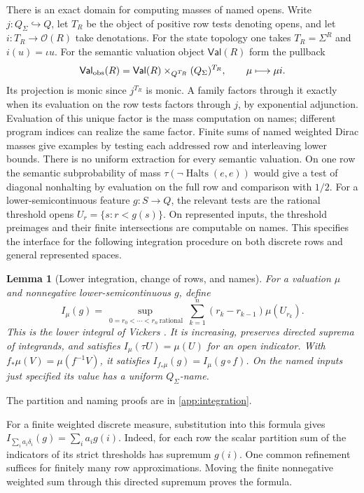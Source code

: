 \documentclass[11pt,a4paper]{article}
\newtheorem{lemma}[lemma]{Lemma}
\theoremstyle{definition}
\theoremstyle{remark}\newaliascnt{remark}{theorem}
\numberwithin{equation}{section}
\begin{document}
There is an exact domain for computing masses of named opens. Write $j:Q_\Sigma\hookrightarrow Q$, let $T_R$ be the object of positive row tests denoting opens, and let $i:T_R\to\mathcal O(R)$ take denotations. For the state topology one takes $T_R=\Sigma^R$ and $i(u)=\iota u$. For the semantic valuation object $\mathsf{Val}(R)$ form the pullback
\[
 \mathsf{Val}_{\rm obs}(R)
 =\mathsf{Val}(R)\times_{Q^{T_R}}(Q_\Sigma)^{T_R},
 \qquad \mu\longmapsto\mu i .
\]
Its projection is monic since $j^{T_R}$ is monic. A family factors through it exactly when its evaluation on the row tests factors through $j$, by exponential adjunction. Evaluation of this unique factor is the mass computation on names; different program indices can realize the same factor. Finite sums of named weighted Dirac masses give examples by testing each addressed row and interleaving lower bounds. There is no uniform extraction for every semantic valuation. On one row the semantic subprobability of mass $\tau(\neg\operatorname{Halts}(e,e))$ would give a test of diagonal nonhalting by evaluation on the full row and comparison with $1/2$. For a lower-semicontinuous feature $g:S\to Q$, the relevant tests are the rational threshold opens $U_r=\{s:r<g(s)\}$. On represented inputs, the threshold preimages and their finite intersections are computable on names. This specifies the interface for the following integration procedure on both discrete rows and general represented spaces.

\begin{lemma}[Lower integration, change of rows, and names]\label{lem:eff-integral}
For a valuation \(\mu\) and nonnegative lower-semicontinuous \(g\), define
\[
 I_\mu(g)=\sup_{\ 0=r_0<\cdots<r_n\ \mathrm{rational}}
              \ \sum_{k=1}^n(r_k-r_{k-1})\mu(U_{r_k}).
\]
This is the lower integral of Vickers \cite[Definition 9]{vickers}. It is increasing, preserves directed suprema of integrands, and satisfies \(I_\mu(\tau U)=\mu(U)\) for an open indicator. With \(f_*\mu(V)=\mu(f^{-1}V)\), it satisfies \(I_{f_*\mu}(g)=I_\mu(g\circ f)\). On the named inputs just specified its value has a uniform \(Q_\Sigma\)-name.
\end{lemma}

The partition and naming proofs are in \cref{app:integration}.

For a finite weighted discrete measure, substitution into this formula gives
\(I_{\sum_i a_i\delta_i}(g)=\sum_i a_i g(i)\). Indeed, for each row the scalar partition sum of the indicators of its strict thresholds has supremum \(g(i)\). One common refinement suffices for finitely many row approximations. Moving the finite nonnegative weighted sum through this directed supremum proves the formula.
\end{document}
